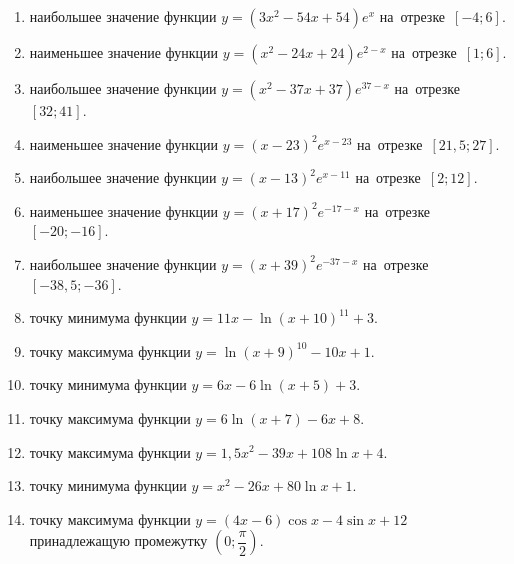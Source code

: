 \documentclass[a4paper,10pt]{article}
\begin{document}
\begin{enumerate}
\item {} наибольшее значение функции $y=\left(3x^2 -54x +54\right)e^{x}$ на~отрезке~$\left[-4;6\right]$.

\item {} наименьшее значение функции $y=\left(x^2 -24x +24\right)e^{2-x}$ на~отрезке~$\left[1;6\right]$.

\item {} наибольшее значение функции $y=\left(x^2 -37x +37\right)e^{37-x}$ на~отрезке~$\left[32;41\right]$.

\item {} наименьшее значение функции $y=\left(x-23\right)^2e^{x-23}$ на~отрезке~$\left[21,5;27\right]$.

\item {} наибольшее значение функции $y=\left(x-13\right)^2e^{x-11}$ на~отрезке~$\left[2;12\right]$.

\item {} наименьшее значение функции $y=\left(x+17\right)^2e^{-17-x}$ на~отрезке~$\left[-20;-16\right]$.

\item {} наибольшее значение функции $y=\left(x+39\right)^2e^{-37-x}$ на~отрезке~$\left[-38,5;-36\right]$.

\item {} точку минимума функции $y=11x-\ln\left(x+10\right)^{11}+3$.

\item {} точку максимума функции $y=\ln\left(x+9\right)^{10}-10x+1$.

\item {} точку минимума функции $y=6x-6\ln\left(x+5\right)+3$.

\item {} точку максимума функции $y=6\ln\left(x+7\right)-6x+8$.

\item {} точку максимума функции $y=1,5x^2-39x+108\ln x +4$.

\item {} точку минимума функции $y=x^2-26x+80\ln x +1$.

\item {} точку максимума функции $y=\left(4x-6\right)\cos x -4\sin x+12$
принадлежащую промежутку $\left(0;\dfrac{\pi}{2}\right)$.








\end{enumerate}
\end{document}
